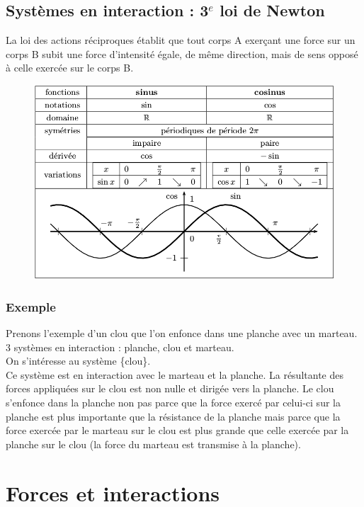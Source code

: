 \documentclass[a4paper,10pt]{book}
\begin{document}
\section{Systèmes en interaction : 3$^{e}$ loi de Newton}
La loi des actions réciproques établit que tout corps A exerçant une force sur un corps B subit une force d'intensité égale, de même direction, mais de sens opposé à celle exercée sur le corps B.
\begin{figure}
\includegraphics[scale=0.8]{images/010.png}
\end{figure}

\subsection*{Exemple}

Prenons l'exemple d'un clou que l'on enfonce dans une planche avec un marteau.\\
3 systèmes en interaction : planche, clou et marteau.\\

On s’intéresse au système \{clou\}.\\
Ce système est en interaction avec le marteau et la planche. La résultante des forces appliquées sur le clou est non nulle et dirigée vers la planche. Le clou s'enfonce dans la planche non pas parce que la force exercé par celui-ci sur la planche est plus importante que la résistance de la planche mais parce que la force exercée par le marteau sur le clou est plus grande que celle exercée par la planche sur le clou (la force du marteau est transmise à la planche).

\chapter{Forces et interactions}
\end{document}
